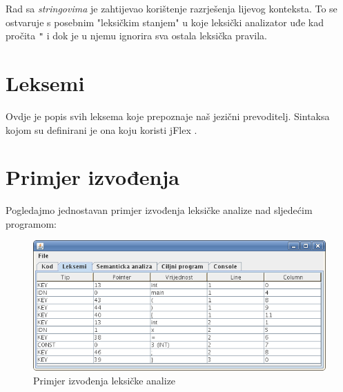 Rad sa \emph{stringovima} je zahtijevao korištenje razrješenja lijevog konteksta. To se ostvaruje s posebnim "leksičkim stanjem" u
koje leksički analizator uđe kad pročita \texttt{"} i dok je u njemu ignorira sva ostala leksička pravila. 

\section{Leksemi}

Ovdje je popis svih leksema koje prepoznaje naš jezični prevoditelj. Sintaksa kojom su definirani je ona koju koristi jFlex \cite{jflex}.



\section{Primjer izvođenja}

Pogledajmo jednostavan primjer izvođenja leksičke analize nad sljedećim programom:



\begin{figure}[H]
  \centering
    \includegraphics[width=13cm]{primjer-leksicka1}
  \caption{Primjer izvođenja leksičke analize}
\label{komponente}
\end{figure}
